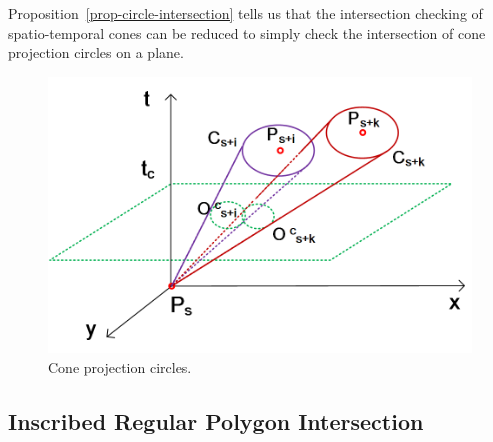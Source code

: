

Proposition~\ref{prop-circle-intersection} tells us that the intersection checking of spatio-temporal cones can be reduced to simply check the intersection of cone projection circles on a plane. %

\begin{figure}[tb!]
	\centering
	\includegraphics[scale=0.7]{figures/Fig-project-circle.png}
	\caption{\small Cone projection circles.}
	\vspace{-1ex}
	\label{fig:pcircle}
\end{figure}


\subsection{Inscribed Regular Polygon Intersection}
\label{subsec-RPI}

